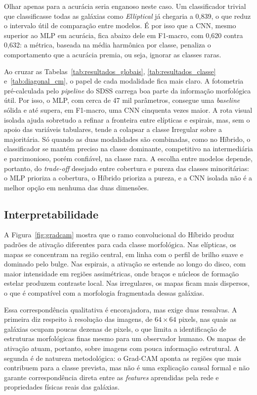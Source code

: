 \documentclass[12pt, a4paper]{article}
\begin{document}
Olhar apenas para a acurácia seria enganoso neste caso. Um
classificador trivial que classificasse todas as galáxias como
\textit{Elliptical} já chegaria a 0,839, o que reduz o intervalo útil
de comparação entre modelos. É por isso que a CNN, mesmo superior ao
MLP em acurácia, fica abaixo dele em F1-macro, com 0,620 contra
0,632: a métrica, baseada na média harmônica por classe, penaliza o
comportamento que a acurácia premia, ou seja, ignorar as classes
raras.

Ao cruzar as Tabelas~\ref{tab:resultados_globais},
\ref{tab:resultados_classe} e~\ref{tab:diagonal_cm}, o papel de cada
modalidade fica mais claro. A fotometria pré-calculada pelo
\textit{pipeline} do SDSS carrega boa parte da informação morfológica
útil. Por isso, o MLP, com cerca de 47 mil parâmetros, consegue uma
\textit{baseline} sólida e até supera, em F1-macro, uma CNN cinquenta
vezes maior. A rota visual isolada ajuda sobretudo a refinar a
fronteira entre elípticas e espirais, mas, sem o apoio das variáveis
tabulares, tende a colapsar a classe Irregular sobre a majoritária.
Só quando as duas modalidades são combinadas, como no Híbrido, o
classificador se mantém preciso na classe dominante, competitivo na
intermediária e parcimonioso, porém confiável, na classe rara. A
escolha entre modelos depende, portanto, do \textit{trade-off}
desejado entre cobertura e pureza das classes minoritárias: o MLP
prioriza a cobertura, o Híbrido prioriza a pureza, e a CNN isolada
não é a melhor opção em nenhuma das duas dimensões.

\subsection{Interpretabilidade}

A Figura~\ref{fig:gradcam} mostra que o ramo convolucional do Híbrido
produz padrões de ativação diferentes para cada classe morfológica.
Nas elípticas, os mapas se concentram na região central, em linha com
o perfil de brilho suave e dominado pelo bulge. Nas espirais, a
ativação se estende ao longo do disco, com maior intensidade em
regiões assimétricas, onde braços e núcleos de formação estelar
produzem contraste local. Nas irregulares, os mapas ficam mais
dispersos, o que é compatível com a morfologia fragmentada dessas
galáxias.

Essa correspondência qualitativa é encorajadora, mas exige duas
ressalvas. A primeira diz respeito à resolução das imagens, de
$64\times 64$ pixels, nas quais as galáxias ocupam poucas dezenas de
pixels, o que limita a identificação de estruturas morfológicas finas
mesmo para um observador humano. Os mapas de ativação atuam, portanto,
sobre imagens com pouca informação estrutural. A segunda é de natureza
metodológica: o Grad-CAM aponta as regiões que mais contribuem para a
classe prevista, mas não é uma explicação causal formal e não garante
correspondência direta entre as \textit{features} aprendidas pela
rede e propriedades físicas reais das galáxias.
\end{document}

